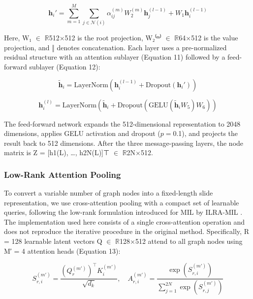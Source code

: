 \documentclass[11pt,a4paper]{article}
\begin{document}
\begin{equation}
\mathbf{h}_i' = \sum_{m=1}^M \sum_{j \in \mathcal{N}(i)} \alpha_{ij}^{(m)} W_2^{(m)} \mathbf{h}_j^{(l-1)} + W_1 \mathbf{h}_i^{(l-1)}
\label{eq:aggregate}
\end{equation}

Here, W₁ $\in$ $\mathbb{R}$512$\times$512 is the root projection, W₂⁽ᵐ⁾ $\in$ $\mathbb{R}$64$\times$512 is the value projection, and ‖ denotes concatenation. Each layer uses a pre-normalized residual structure with an attention sublayer (Equation 11) followed by a feed-forward sublayer (Equation 12):


\begin{equation}
\tilde{\mathbf{h}}_i = \text{LayerNorm}\left(\mathbf{h}_i^{(l-1)} + \text{Dropout}(\mathbf{h}_i')\right)
\label{eq:prenorm}
\end{equation}


\begin{equation}
\mathbf{h}_i^{(l)} = \text{LayerNorm}\left(\tilde{\mathbf{h}}_i + \text{Dropout}\left(\text{GELU}(\tilde{\mathbf{h}}_i W_5) W_6\right)\right)
\label{eq:ffn}
\end{equation}

The feed-forward network expands the 512-dimensional representation to 2048 dimensions, applies GELU activation and dropout ($p = 0.$1), and projects the result back to 512 dimensions. After the three message-passing layers, the node matrix is Z = [h1(L), …, h2N(L)]⊤ $\in$ $\mathbb{R}$2N$\times$512.


\subsubsection{Low-Rank Attention Pooling}
To convert a variable number of graph nodes into a fixed-length slide representation, we use cross-attention pooling with a compact set of learnable queries, following the low-rank formulation introduced for MIL by ILRA-MIL \cite{ref26}. The implementation used here consists of a single cross-attention operation and does not reproduce the iterative procedure in the original method. Specifically, R = 128 learnable latent vectors Q $\in$ $\mathbb{R}$128$\times$512 attend to all graph nodes using M′ = 4 attention heads (Equation 13):


\begin{equation}
S_{r,i}^{(m')} = \frac{(Q_r^{(m')})^\top K_i^{(m')}}{\sqrt{d_k}}, \quad A_{r,i}^{(m')} = \frac{\exp(S_{r,i}^{(m')})}{\sum_{j=1}^{2N} \exp(S_{r,j}^{(m')})}
\label{eq:lra}
\end{equation}
\end{document}
